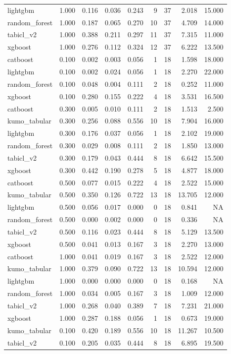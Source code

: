\begin{table}
\begin{tabular}{lrrrrrrrr}
lightgbm & 1.000 & 0.116 & 0.036 & 0.243 & 9 & 37 & 2.018 & 15.000 \\
random\_forest & 1.000 & 0.187 & 0.065 & 0.270 & 10 & 37 & 4.709 & 14.000 \\
tabicl\_v2 & 1.000 & 0.388 & 0.211 & 0.297 & 11 & 37 & 7.315 & 11.000 \\
xgboost & 1.000 & 0.276 & 0.112 & 0.324 & 12 & 37 & 6.222 & 13.500 \\
catboost & 0.100 & 0.002 & 0.003 & 0.056 & 1 & 18 & 1.598 & 18.000 \\
lightgbm & 0.100 & 0.002 & 0.024 & 0.056 & 1 & 18 & 2.270 & 22.000 \\
random\_forest & 0.100 & 0.048 & 0.004 & 0.111 & 2 & 18 & 0.252 & 11.000 \\
xgboost & 0.100 & 0.280 & 0.155 & 0.222 & 4 & 18 & 3.531 & 16.500 \\
catboost & 0.300 & 0.005 & 0.010 & 0.111 & 2 & 18 & 1.513 & 2.500 \\
kumo\_tabular & 0.300 & 0.256 & 0.088 & 0.556 & 10 & 18 & 7.904 & 16.000 \\
lightgbm & 0.300 & 0.176 & 0.037 & 0.056 & 1 & 18 & 2.102 & 19.000 \\
random\_forest & 0.300 & 0.029 & 0.008 & 0.111 & 2 & 18 & 1.850 & 13.000 \\
tabicl\_v2 & 0.300 & 0.179 & 0.043 & 0.444 & 8 & 18 & 6.642 & 15.500 \\
xgboost & 0.300 & 0.442 & 0.190 & 0.278 & 5 & 18 & 4.877 & 18.000 \\
catboost & 0.500 & 0.077 & 0.015 & 0.222 & 4 & 18 & 2.522 & 15.000 \\
kumo\_tabular & 0.500 & 0.350 & 0.126 & 0.722 & 13 & 18 & 13.705 & 12.000 \\
lightgbm & 0.500 & 0.056 & 0.017 & 0.000 & 0 & 18 & 0.841 & NA \\
random\_forest & 0.500 & 0.000 & 0.002 & 0.000 & 0 & 18 & 0.336 & NA \\
tabicl\_v2 & 0.500 & 0.116 & 0.023 & 0.444 & 8 & 18 & 5.129 & 13.500 \\
xgboost & 0.500 & 0.041 & 0.013 & 0.167 & 3 & 18 & 2.270 & 13.000 \\
catboost & 1.000 & 0.041 & 0.019 & 0.167 & 3 & 18 & 2.522 & 12.000 \\
kumo\_tabular & 1.000 & 0.379 & 0.090 & 0.722 & 13 & 18 & 10.594 & 12.000 \\
lightgbm & 1.000 & 0.000 & 0.000 & 0.000 & 0 & 18 & 0.168 & NA \\
random\_forest & 1.000 & 0.034 & 0.005 & 0.167 & 3 & 18 & 1.009 & 12.000 \\
tabicl\_v2 & 1.000 & 0.268 & 0.040 & 0.389 & 7 & 18 & 7.231 & 21.000 \\
xgboost & 1.000 & 0.287 & 0.188 & 0.056 & 1 & 18 & 0.673 & 19.000 \\
kumo\_tabular & 0.100 & 0.420 & 0.189 & 0.556 & 10 & 18 & 11.267 & 10.500 \\
tabicl\_v2 & 0.100 & 0.205 & 0.035 & 0.444 & 8 & 18 & 6.895 & 19.500 \\
\bottomrule
\end{tabular}
\end{table}
